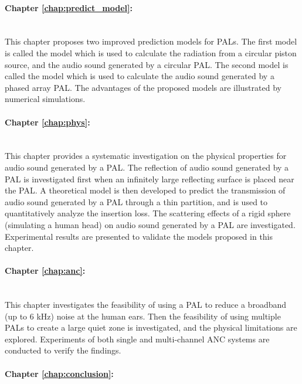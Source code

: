 \noindent\paragraph{Chapter \ref{chap:predict_model}: }\mbox{}\\

This chapter proposes two improved prediction models for PALs.
The first model is called the  model which is used to calculate the radiation from a circular piston source, and the audio sound generated by a circular PAL.
The second model is called the  model which is used to calculate the audio sound generated by a phased array PAL.
The advantages of the proposed models are illustrated by numerical simulations.

\noindent\paragraph{Chapter \ref{chap:phys}: } \mbox{}\\

This chapter provides a systematic investigation on the physical properties for audio sound generated by a PAL.
The reflection of audio sound generated by a PAL is investigated first when an infinitely large reflecting surface is placed near the PAL. 
A theoretical model is then developed to predict the transmission of audio sound generated by a PAL through a thin partition, and is used to quantitatively analyze the insertion loss. 
The scattering effects of a rigid sphere (simulating a human head) on audio sound generated by a PAL are investigated.
Experimental results are presented to validate the models proposed in this chapter.

\noindent\paragraph{Chapter \ref{chap:anc}: } \mbox{}\\

This chapter investigates the feasibility of using a PAL to reduce a broadband (up to 6 kHz) noise at the human ears.
Then the feasibility of using multiple PALs to create a large quiet zone is investigated, and the physical limitations are explored. 
Experiments of both single and  multi-channel ANC systems are conducted to verify the findings.

\noindent\paragraph{Chapter \ref{chap:conclusion}: } \mbox{}\\

